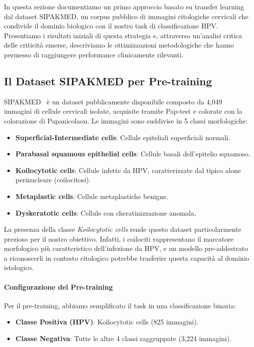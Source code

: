 	In questa sezione documentiamo un primo approccio basato su transfer learning dal dataset SIPAKMED, un corpus pubblico di immagini citologiche cervicali che condivide il dominio biologico con il nostro task di classificazione HPV. Presentiamo i risultati iniziali di questa strategia e, attraverso un'analisi critica delle criticità emerse, descriviamo le ottimizzazioni metodologiche che hanno permesso di raggiungere performance clinicamente rilevanti.
	
	\subsection{Il Dataset SIPAKMED per Pre-training}
	
	SIPAKMED~\cite{plissiti2018sipakmed} è un dataset pubblicamente disponibile composto da 4,049 immagini di cellule cervicali isolate, acquisite tramite Pap-test e colorate con la colorazione di Papanicolaou. Le immagini sono suddivise in 5 classi morfologiche:
	
	\begin{itemize}
		\item \textbf{Superficial-Intermediate cells}: Cellule epiteliali superficiali normali.
		\item \textbf{Parabasal squamous epithelial cells}: Cellule basali dell'epitelio squamoso.
		\item \textbf{Koilocytotic cells}: Cellule infette da HPV, caratterizzate dal tipico alone perinucleare (coilocitosi).
		\item \textbf{Metaplastic cells}: Cellule metaplastiche benigne.
		\item \textbf{Dyskeratotic cells}: Cellule con cheratinizzazione anomala.
	\end{itemize}
	
	La presenza della classe \textit{Koilocytotic cells} rende questo dataset particolarmente prezioso per il nostro obiettivo. Infatti, i coilociti rappresentano il marcatore morfologico più caratteristico dell'infezione da HPV, e un modello pre-addestrato a riconoscerli in contesto citologico potrebbe trasferire questa capacità al dominio istologico.
	
	\paragraph{Configurazione del Pre-training}
	Per il pre-training, abbiamo semplificato il task in una classificazione binaria:
	\begin{itemize}
		\item \textbf{Classe Positiva (HPV)}: Koilocytotic cells (825 immagini).
		\item \textbf{Classe Negativa}: Tutte le altre 4 classi raggruppate (3,224 immagini).
	\end{itemize}
	
